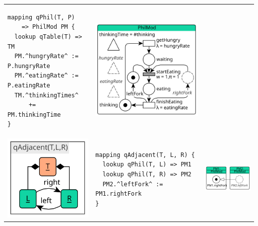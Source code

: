 \begin{table}
\begin{tabular}{@{}>{\centering\arraybackslash}m{}@{}m{}@{}>{\centering\arraybackslash}m{}@{}}
\begin{lstlisting}
mapping qPhil(T, P)
    => PhilMod PM {
  lookup qTable(T) => TM
  PM.^hungryRate^ := P.hungryRate
  PM.^eatingRate^ := P.eatingRate
  TM.^thinkingTimes^
      += PM.thinkingTime
}
\end{lstlisting} &\includegraphics[scale=0.8]{figures/phil_module}\\[-2ex]
  \includegraphics[scale=0.8]{figures/q_adjacent_pattern}& \begin{lstlisting}
mapping qAdjacent(T, L, R) {
  lookup qPhil(T, L) => PM1
  lookup qPhil(T, R) => PM2
  PM2.^leftFork^ := PM1.rightFork
}
\end{lstlisting} &\includegraphics[scale=0.8]{figures/adjacent_phils_module}\\
    \bottomrule
  \end{tabular}
\end{table}

